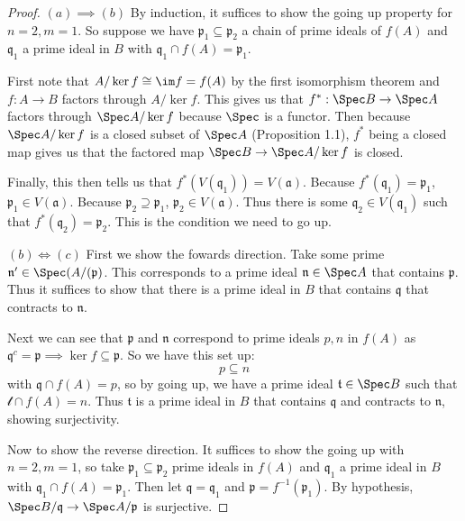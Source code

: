 \begin{proof}
	$(a) \implies (b) $ 
	By induction, it suffices to show the going up property for $n=2,m=1 $.
	So suppose we have $\mathfrak{p}_1 \subseteq \mathfrak{p}_2$ a chain of prime ideals of $f(A) $ and $\mathfrak{q}_1$ a prime ideal in $B $ with $\mathfrak{q}_1\cap f(A) = \mathfrak{p}_1 $.

	First note that $A / \ker f \cong \im f = f(A) $ by the first isomorphism theorem and $f: A\to B $ factors through $A / \ker f $.
	This gives us that $f^\ast: \Spec B \to \Spec A $ factors through $\Spec A / \ker f $ because $\Spec$ is a functor.
	Then because $\Spec A / \ker f $ is a closed subset of $\Spec A $ (Proposition 1.1), $f^\ast $ being a closed map gives us that the factored map $\Spec B \to \Spec A / \ker f $ is closed.

	Finally, this then tells us that $f^\ast(V(\mathfrak{q}_1)) = V(\mathfrak{a}) $.
	Because $f^\ast(\mathfrak{q}_1) = \mathfrak{p}_1 $, $\mathfrak{p}_1 \in V(\mathfrak{a}) $.
	Because $\mathfrak{p}_2 \supseteq \mathfrak{p}_1 $, $\mathfrak{p}_2 \in V(\mathfrak{a}) $.
	Thus there is some $\mathfrak{q}_2 \in V(\mathfrak{q}_1) $ such that $f^\ast(\mathfrak{q}_2) = \mathfrak{p}_2 $.
	This is the condition we need to go up.

	$(b) \iff (c) $ First we show the fowards direction.
	Take some prime $\mathfrak{n}' \in \Spec(A/(\mathfrak{p}) $.
	This corresponds to a prime ideal $\mathfrak{n} \in \Spec A $ that contains $\mathfrak{p} $.
	Thus it suffices to show that there is a prime ideal in $B $ that contains $\mathfrak{q} $ that contracts to $\mathfrak{n} $.

	Next we can see that $\mathfrak{p} $ and $\mathfrak{n} $ correspond to prime ideals $p,n $ in $f(A) $ as $\mathfrak{q}^c = \mathfrak{p} \implies \ker f \subseteq \mathfrak{p} $.
	So we have this set up:
	\[
		p \subseteq n
	\]
	with $\mathfrak{q}\cap f(A) = p$, so by going up, we have a prime ideal $\mathfrak{t} \in \Spec B $ such that $\mathscr{t} \cap f(A) = n $.
	Thus $\mathfrak{t} $ is a prime ideal in $B $ that contains $\mathfrak{q} $ and contracts to $\mathfrak{n} $, showing surjectivity.

	Now to show the reverse direction.
	It suffices to show the going up with $n=2,m=1$, so take $\mathfrak{p}_1 \subseteq \mathfrak{p}_2 $ prime ideals in $f(A) $ and $\mathfrak{q}_1 $ a prime ideal in $B $ with $\mathfrak{q}_1 \cap f(A) = \mathfrak{p}_1 $.
	Then let $\mathfrak{q} = \mathfrak{q}_1 $ and $\mathfrak{p}= f^{-1}(\mathfrak{p}_1) $.
	By hypothesis, $\Spec B / \mathfrak{q} \to \Spec A / \mathfrak{p} $ is surjective.


\end{proof}

